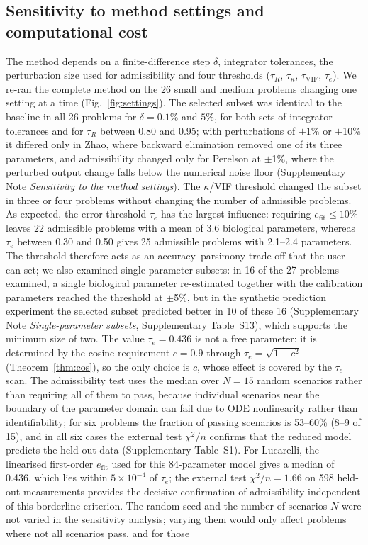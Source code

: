 \documentclass[pdflatex,sn-nature]{sn-jnl}
\theoremstyle{plain}
\begin{document}
\subsection*{Sensitivity to method settings and computational cost}\label{sec:settings}

The method depends on a finite-difference step $\delta$, integrator tolerances, the perturbation size used for admissibility and four thresholds ($\tau_R$, $\tau_\kappa$, $\tau_{\mathrm{VIF}}$, $\tau_e$). We re-ran the complete method on the 26 small and medium problems changing one setting at a time (Fig.~\ref{fig:settings}). The selected subset was identical to the baseline in all 26 problems for $\delta=0.1\%$ and $5\%$, for both sets of integrator tolerances and for $\tau_R$ between 0.80 and 0.95; with perturbations of $\pm$1\% or $\pm$10\% it differed only in Zhao, where backward elimination removed one of its three parameters, and admissibility changed only for Perelson at $\pm$1\%, where the perturbed output change falls below the numerical noise floor (Supplementary Note \textit{Sensitivity to the method settings}). The $\kappa$/VIF threshold changed the subset in three or four problems without changing the number of admissible problems. As expected, the error threshold $\tau_e$ has the largest influence: requiring $e_{\mathrm{fit}}\le 10\%$ leaves 22 admissible problems with a mean of 3.6 biological parameters, whereas $\tau_e$ between 0.30 and 0.50 gives 25 admissible problems with 2.1--2.4 parameters. The threshold therefore acts as an accuracy--parsimony trade-off that the user can set; we also examined single-parameter subsets: in 16 of the 27 problems examined, a single biological parameter re-estimated together with the calibration parameters reached the threshold at $\pm$5\%, but in the synthetic prediction experiment the selected subset predicted better in 10 of these 16 (Supplementary Note \textit{Single-parameter subsets}, Supplementary Table~S13), which supports the minimum size of two. The value $\tau_e=0.436$ is not a free parameter: it is determined by the cosine requirement $c=0.9$ through $\tau_e=\sqrt{1-c^2}$ (Theorem~\ref{thm:cos}), so the only choice is $c$, whose effect is covered by the $\tau_e$ scan. The admissibility test uses the median over $N=15$ random scenarios rather than requiring all of them to pass, because individual scenarios near the boundary of the parameter domain can fail due to ODE nonlinearity rather than identifiability; for six problems the fraction of passing scenarios is 53--60\% (8--9 of 15), and in all six cases the external test $\chi^2/n$ confirms that the reduced model predicts the held-out data (Supplementary Table~S1). For Lucarelli, the linearised first-order $e_{\mathrm{fit}}$ used for this 84-parameter model gives a median of 0.436, which lies within $5\times10^{-4}$ of $\tau_e$; the external test $\chi^2/n=1.66$ on 598 held-out measurements provides the decisive confirmation of admissibility independent of this borderline criterion. The random seed and the number of scenarios $N$ were not varied in the sensitivity analysis; varying them would only affect problems where not all scenarios pass, and for those 
\end{document}

